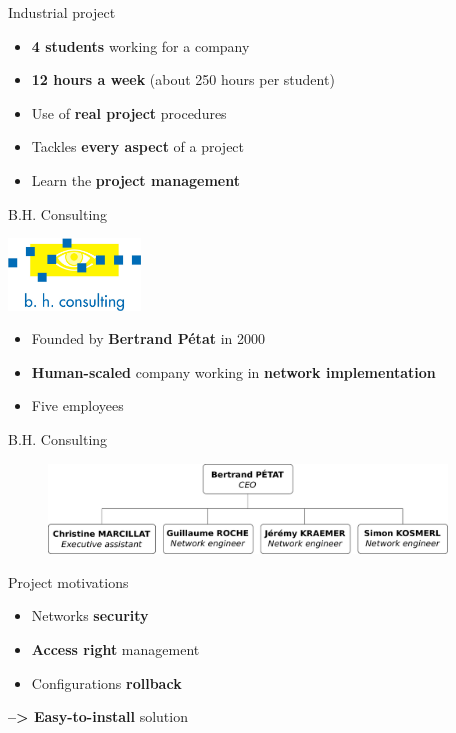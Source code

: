 \documentclass[12pt]{beamer}
\begin{document}
\begin{frame}{Industrial project}
    \begin{itemize}[<+->]
    \item \textbf{4 students} working for a company\vfill
    \item \textbf{12 hours a week} (about 250 hours per student)\vfill
    \item Use of \textbf{real project} procedures\vfill
    \item Tackles \textbf{every aspect} of a project\vfill
    \item Learn the \textbf{project management} \vfill
    \end{itemize}
\end{frame}

\begin{frame}{B.H. Consulting}
    \begin{center}
	\includegraphics[width=100pt]{img/BHConsulting.jpg}
    \end{center}

    \begin{itemize}[<+->]
    \item Founded by \textbf{Bertrand Pétat} in 2000\vfill
    \item \textbf{Human-scaled} company working in \textbf{network implementation}\vfill
    \item Five employees\vfill
    \end{itemize}
\end{frame}

\begin{frame}{B.H. Consulting}
\vfill
    \begin{figure}
	\includegraphics[width=300pt]{img/organigramme_en.pdf}
    \end{figure}
\vfill
\end{frame}

\begin{frame}{Project motivations}
    \begin{itemize}[<+->]
	\item Networks \textbf{security}
	\vfill
	\item \textbf{Access right} management
	\vfill
	\item Configurations \textbf{rollback}
	\vfill
    \end{itemize}
\pause
\textbf{--> Easy-to-install} solution

\end{frame}
    
\end{document}

